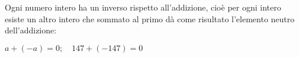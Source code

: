 Ogni numero intero ha un inverso rispetto all'addizione, cioè per ogni intero 
esiste un altro intero che sommato al primo dà come risultato l'elemento neutro 
dell'addizione:

$a + (-a) = 0; \quad 147 + (-147) = 0$

% 
% 
% 
% 
% 
% 
% 
% 
% 
% 
% 
% 
% 
% 
% 
